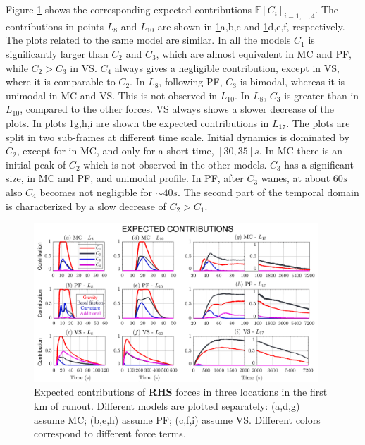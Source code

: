 \documentclass{article}
\begin{document}
Figure \ref{fig:Colima-Ci_1} shows the corresponding expected contributions $\mathbb E[C_i]_{i=1,\dots,4}$. The contributions in points $L_8$ and $L_{10}$ are shown in \ref{fig:Colima-Ci_1}a,b,c and \ref{fig:Colima-Ci_1}d,e,f, respectively. The plots related to the same model are similar. In all the models $C_1$ is significantly larger than $C_2$ and $C_3$, which are almost equivalent in MC and PF, while $C_2>C_3$ in VS. $C_4$ always gives a negligible contribution, except in VS, where it is comparable to $C_2$. In $L_8$, following PF, $C_3$ is bimodal, whereas it is unimodal in MC and VS. This is not observed in $L_{10}$. In $L_8$, $C_3$ is greater than in $L_{10}$, compared to the other forces. VS always shows a slower decrease of the plots. In plots \ref{fig:Colima-Ci_1}g,h,i are shown the expected contributions in $L_{17}$. The plots are split in two sub-frames at different time scale. Initial dynamics is dominated by $C_2$, except for in MC, and only for a short time, $[30, 35] s$. In MC there is an initial peak of $C_2$ which is not observed in the other models. $C_3$ has a significant size, in MC and PF, and unimodal profile. In PF, after $C_3$ wanes, at about $60 s$ also $C_4$ becomes not negligible for $\sim 40 s$. The second part of the temporal domain is characterized by a slow decrease of $C_2>C_1$.
\begin{figure}[H]
         \centering
        \includegraphics[width=0.95\textwidth]{figures/Colima/Ci1_total.png}
        \caption{Expected contributions of \textbf{RHS} forces in three locations in the first km of runout. Different models are plotted separately: (a,d,g) assume MC; (b,e,h) assume PF; (c,f,i) assume VS. Different colors correspond to different force terms.}
        \label{fig:Colima-Ci_1}
\end{figure}
\end{document}
